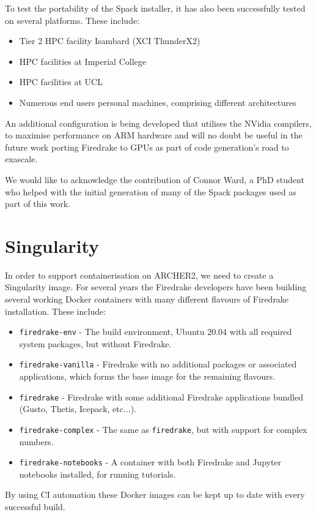 \documentclass[a4paper,11pt]{article}
\begin{document}
To test the portability of the Spack installer, it has also been successfully tested on several platforms.
These include:
\begin{itemize}[topsep=2pt, partopsep=0pt, itemsep=1pt, parsep=1pt]
	\item Tier 2 HPC facility Isambard (XCI ThunderX2)
	\item HPC facilities at Imperial College
	\item HPC facilities at UCL
	\item Numerous end users personal machines, comprising different architectures
\end{itemize} 
An additional configuration is being developed that utilises the NVidia compilers, to maximise performance on ARM hardware and will no doubt be useful in the future work porting Firedrake to GPUs as part of code generation's road to exascale.

We would like to acknowledge the contribution of Connor Ward, a PhD student who helped with the initial generation of many of the Spack packages used as part of this work.


\section{Singularity}
\label{sec:singularity}
In order to support containerisation on ARCHER2, we need to create a Singularity image.
For several years the Firedrake developers have been building several working Docker containers with many different flavours of Firedrake installation.
These include:
\begin{itemize}[topsep=2pt, partopsep=0pt, itemsep=1pt, parsep=1pt]
	\item \verb`firedrake-env` - The build environment, Ubuntu 20.04 with all required system packages, but without Firedrake.
	\item \verb`firedrake-vanilla` - Firedrake with no additional packages or associated applications, which forms the base image for the remaining flavours.
	\item \verb`firedrake` - Firedrake with some additional Firedrake applications bundled (Gusto, Thetis, Icepack, etc...).
	\item \verb`firedrake-complex` - The same as \verb`firedrake`, but with support for complex numbers.
	\item \verb`firedrake-notebooks` - A container with both Firedrake and Jupyter notebooks installed, for running tutorials.
\end{itemize}    
By using CI automation these Docker images can be kept up to date with every successful build.
\end{document}

